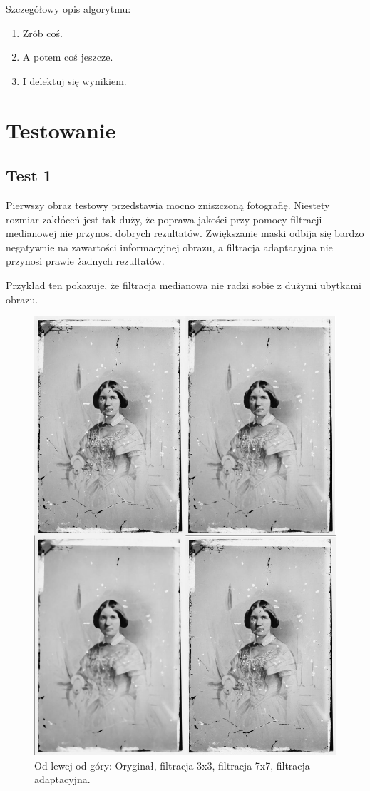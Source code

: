 \documentclass[a4paper,12pt,oneside,notitlepage,onecolumn]{article}
\begin{document}
Szczegółowy opis algorytmu:
\begin{enumerate}
 \item Zrób coś.
 \item A potem coś jeszcze.
 \item I delektuj się wynikiem.
\end{enumerate}

\section{Testowanie}
\subsection{Test 1}
Pierwszy obraz testowy przedstawia mocno zniszczoną fotografię.
Niestety rozmiar zakłóceń jest tak duży, że poprawa jakości przy pomocy filtracji medianowej nie przynosi dobrych rezultatów.
Zwiększanie maski odbija się bardzo negatywnie na zawartości informacyjnej obrazu, a filtracja adaptacyjna nie przynosi prawie żadnych rezultatów.

Przykład ten pokazuje, że filtracja medianowa nie radzi sobie z dużymi ubytkami obrazu.
\begin{figure}
\centering
\includegraphics[width=13cm]{test1_final.jpg}
\caption{Od lewej od góry: Oryginał, filtracja 3x3, filtracja 7x7, filtracja adaptacyjna.}
\end{figure}
\end{document}
